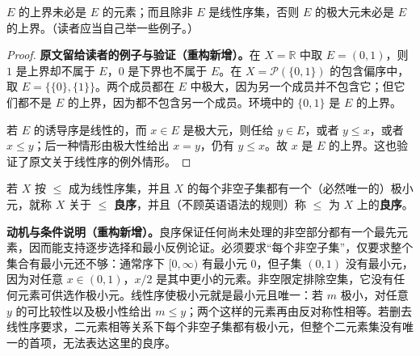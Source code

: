 \documentclass[../../main.tex]{subfiles}%
\begin{document}
\begin{remark}
$E$ 的上界未必是 $E$ 的元素；而且除非 $E$ 是线性序集，否则 $E$ 的极大元未必是 $E$ 的上界。（读者应当自己举一些例子。）
\end{remark}
\begin{proof}
\textbf{原文留给读者的例子与验证（重构新增）。}在 $X=\mathbb{R}$ 中取 $E=(0,1)$，则 $1$ 是上界却不属于 $E$，$0$ 是下界也不属于 $E$。在 $X=\mathscr{P}(\{0,1\})$ 的包含偏序中，取 $E=\{\{0\},\{1\}\}$。两个成员都在 $E$ 中极大，因为另一个成员并不包含它；但它们都不是 $E$ 的上界，因为都不包含另一个成员。环境中的 $\{0,1\}$ 是 $E$ 的上界。

若 $E$ 的诱导序是线性的，而 $x\in E$ 是极大元，则任给 $y\in E$，或者 $y\leqslant x$，或者 $x\leqslant y$；后一种情形由极大性给出 $x=y$，仍有 $y\leqslant x$。故 $x$ 是 $E$ 的上界。这也验证了原文关于线性序的例外情形。
\end{proof}




\begin{definition}[良序]\label{definition:ch00-well-order}
若 $X$ 按 $\leqslant$ 成为线性序集，并且 $X$ 的每个非空子集都有一个（必然唯一的）极小元，就称 $X$ 关于 $\leqslant$ \textbf{良序}，并且（不顾英语语法的规则）称 $\leqslant$ 为 $X$ 上的\textbf{良序}。
\end{definition}
\begin{remark}
\textbf{动机与条件说明（重构新增）。}良序保证任何尚未处理的非空部分都有一个最先元素，因而能支持逐步选择和最小反例论证。必须要求“每个非空子集”，仅要求整个集合有最小元还不够：通常序下 $[0,\infty)$ 有最小元 $0$，但子集 $(0,1)$ 没有最小元，因为对任意 $x\in(0,1)$，$x/2$ 是其中更小的元素。非空限定排除空集，它没有任何元素可供选作极小元。线性序使极小元就是最小元且唯一：若 $m$ 极小，对任意 $y$ 的可比较性以及极小性给出 $m\leqslant y$；两个这样的元素再由反对称性相等。若删去线性序要求，二元素相等关系下每个非空子集都有极小元，但整个二元素集没有唯一的首项，无法表达这里的良序。
\end{remark}
\end{document}
